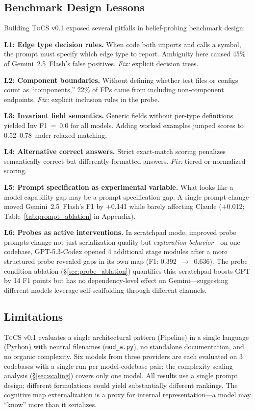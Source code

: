 \documentclass{article}
\newcommand{\tocs}{\textsc{ToCS}}
\begin{document}
\subsection{Benchmark Design Lessons}
\label{sec:lessons}

Building \tocs{} v0.1 exposed several pitfalls in belief-probing benchmark design:

\textbf{L1: Edge type decision rules.} When code both imports and calls a symbol, the prompt must specify which edge type to report. Ambiguity here caused 45\% of Gemini~2.5~Flash's false positives. \emph{Fix:} explicit decision trees.

\textbf{L2: Component boundaries.} Without defining whether test files or configs count as ``components,'' 22\% of FPs came from including non-component endpoints. \emph{Fix:} explicit inclusion rules in the probe.

\textbf{L3: Invariant field semantics.} Generic fields without per-type definitions yielded Inv F1~=~0.0 for all models. Adding worked examples jumped scores to 0.52--0.78 under relaxed matching.

\textbf{L4: Alternative correct answers.} Strict exact-match scoring penalizes semantically correct but differently-formatted answers. \emph{Fix:} tiered or normalized scoring.

\textbf{L5: Prompt specification as experimental variable.} What looks like a model capability gap may be a prompt specification gap. A single prompt change moved Gemini~2.5~Flash's F1 by $+$0.141 while barely affecting Claude ($+$0.012; Table~\ref{tab:prompt_ablation} in Appendix).

\textbf{L6: Probes as active interventions.} In scratchpad mode, improved probe prompts change not just serialization quality but \emph{exploration behavior}---on one codebase, GPT-5.3-Codex opened 4 additional stage modules after a more structured probe revealed gaps in its own map (F1: 0.392~$\to$~0.636). The probe condition ablation (\S\ref{sec:probe_ablation}) quantifies this: scratchpad boosts GPT by 14 F1 points but has no dependency-level effect on Gemini---suggesting different models leverage self-scaffolding through different channels.

\subsection{Limitations}
\label{sec:limitations}

\tocs{} v0.1 evaluates a single architectural pattern (Pipeline) in a single language (Python) with neutral filenames (\texttt{mod\_a.py}), no standalone documentation, and no organic complexity. Six models from three providers are each evaluated on 3 codebases with a single run per model-codebase pair; the complexity scaling analysis (\S\ref{sec:scaling}) covers only one model. All results use a single prompt design; different formulations could yield substantially different rankings. The cognitive map externalization is a proxy for internal representation---a model may ``know'' more than it serializes.
\end{document}
